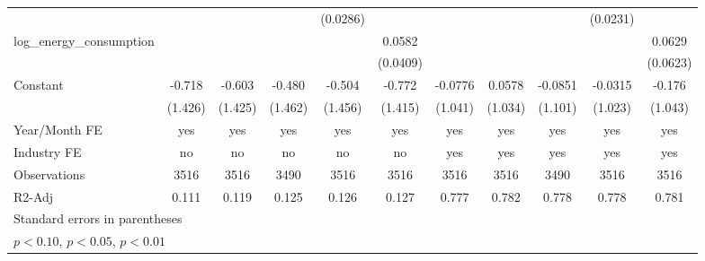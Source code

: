\begin{table}[htbp]
\begin{tabular}{l*{10}{c}}
                    &                     &                     &                     &    (0.0286)         &                     &                     &                     &                     &    (0.0231)         &                     \\
[1em]
log\_energy\_consumption&                     &                     &                     &                     &      0.0582         &                     &                     &                     &                     &      0.0629         \\
                    &                     &                     &                     &                     &    (0.0409)         &                     &                     &                     &                     &    (0.0623)         \\
[1em]
Constant            &      -0.718         &      -0.603         &      -0.480         &      -0.504         &      -0.772         &     -0.0776         &      0.0578         &     -0.0851         &     -0.0315         &      -0.176         \\
                    &     (1.426)         &     (1.425)         &     (1.462)         &     (1.456)         &     (1.415)         &     (1.041)         &     (1.034)         &     (1.101)         &     (1.023)         &     (1.043)         \\
\hline
Year/Month FE       &         yes         &         yes         &         yes         &         yes         &         yes         &         yes         &         yes         &         yes         &         yes         &         yes         \\
Industry FE         &          no         &          no         &          no         &          no         &          no         &         yes         &         yes         &         yes         &         yes         &         yes         \\
Observations        &        3516         &        3516         &        3490         &        3516         &        3516         &        3516         &        3516         &        3490         &        3516         &        3516         \\
R2-Adj              &       0.111         &       0.119         &       0.125         &       0.126         &       0.127         &       0.777         &       0.782         &       0.778         &       0.778         &       0.781         \\
\hline\hline
\multicolumn{11}{l}{\footnotesize Standard errors in parentheses}\\
\multicolumn{11}{l}{\footnotesize \sym{*} \(p<0.10\), \sym{**} \(p<0.05\), \sym{***} \(p<0.01\)}\\
\end{tabular}
\end{table}
